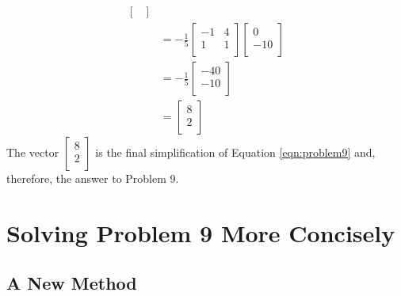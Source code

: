 \documentclass[titlepage]{article}
\begin{document}
\begin{align*}
\begin{bmatrix}
    \end{bmatrix}\\
    &= -\frac{1}{5}
    \begin{bmatrix}
        -1 & 4\\
        1 & 1\\
    \end{bmatrix}
    \begin{bmatrix}
        0\\
        -10\\
    \end{bmatrix}\\
    &= -\frac{1}{5}
    \begin{bmatrix}
        -40\\
        -10\\
    \end{bmatrix}\\
    &=
    \begin{bmatrix}
        8\\
        2\\
    \end{bmatrix}
\end{align*}
The vector $
    \begin{bmatrix}
        8\\
        2\\
    \end{bmatrix}
$ is the final simplification of Equation \ref{eqn:problem9} and, therefore, the answer to Problem 9.
\newpage



\section{Solving Problem 9 More Concisely}
\subsection{A New Method}
\end{document}
